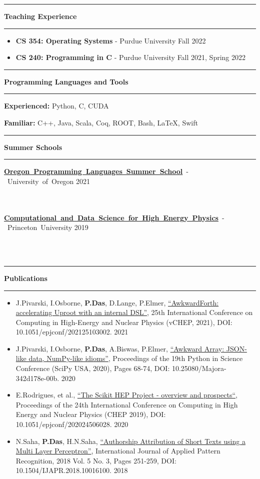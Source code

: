 \documentclass[10pt, letterpaper]{article}
\newcommand{\EducationEntry}[4]{
    \noindent\mbox{#1} \hfill
    \mbox{#2} \\
    \indent
    \mbox{\textit{#3}} \vspace{5pt}\\
    \parbox[t][\height][c]{\textwidth}{\small{#4}}
	\vspace{-14pt}
}
\newcommand{\Section}[1]{
    \Line \par
    \vspace{1pt}
    \textbf{\fontsize{13}{13}\selectfont #1} \par
    \vspace{-7pt}
    \Line \par
    \vspace{3pt}
}
\newcommand{\Line}{
\noindent\rule{\textwidth}{0.4pt}}
\newenvironment{tightitemize}
{
    \vspace{-\topsep}
    \begin{itemize}
        \itemsep2pt \parskip0pt \parsep0pt
}
{
    \end{itemize}
    \vspace{-\topsep}
}
\begin{document}
\Section{Teaching Experience}
\begin{tightitemize}
\item \textbf{CS 354: Operating Systems} - Purdue University \hfill{Fall 2022}
\item \textbf{CS 240: Programming in C} - Purdue University \hfill{Fall 2021, Spring 2022}
\end{tightitemize}

\vspace{-4pt}
%
%
\Section{Programming Languages and Tools}
\vspace{-4pt}
\textbf{Experienced:} Python, C, CUDA

\textbf{Familiar:} C++, Java, Scala, Coq, ROOT, Bash, \LaTeX, Swift
\vspace{-6pt}

%
%
\Section{Summer Schools}
\vspace{-4pt}
\EducationEntry{\textbf{{\href{https://www.cs.uoregon.edu/research/summerschool/summer21/index.php}{Oregon Programming Languages Summer School}}} - University of Oregon}{2021}{}{}\vspace{-15pt}\\
\EducationEntry{\textbf{{\href{https://codas-hep.org/}{Computational and Data Science for High Energy Physics}}} - Princeton University}{2019}{}{}\\

\vspace{-34pt}

%
%
\Section{Publications}
\small{\begin{tightitemize}
    \item J.Pivarski, I.Osborne, {\textbf{P.Das}}, D.Lange, P.Elmer, {\href{https://www.epj-conferences.org/articles/epjconf/abs/2021/05/epjconf_chep2021_03002/epjconf_chep2021_03002.html}{``AwkwardForth: accelerating Uproot with an internal DSL''}}, 25th International Conference on Computing in High-Energy and Nuclear Physics (vCHEP, 2021), DOI: 10.1051/epjconf/202125103002. \hfill{2021}
    \item J.Pivarski, I.Osborne, {\textbf{P.Das}}, A.Biswas, P.Elmer, {\href{http://conference.scipy.org/proceedings/scipy2020/jim_pivarski.html}{``Awkward Array: JSON-like data, NumPy-like idioms''}}, Proceedings of the 19th Python in Science Conference (SciPy USA, 2020), Pages 68-74, DOI: 10.25080/Majora-342d178e-00b. \hfill{2020}
    \item E.Rodrigues, et al., {\href{https://www.epj-conferences.org/articles/epjconf/abs/2020/21/epjconf_chep2020_06028/epjconf_chep2020_06028.html}{``The Scikit HEP Project - overview and prospects``}}, Proceedings of the 24th International Conference on Computing in High Energy and Nuclear Physics (CHEP 2019), DOI: 10.1051/epjconf/202024506028.  \hfill{2020}
    \item N.Saha, {\textbf{P.Das}}, H.N.Saha, {\href{https://www.inderscienceonline.com/doi/abs/10.1504/IJAPR.2018.094819}{``Authorship Attribution of Short Texts using a Multi Layer Perceptron''}}, International Journal of Applied Pattern Recognition, 2018 Vol. 5 No. 3, Pages 251-259, DOI: 10.1504/IJAPR.2018.10016100. \hfill{2018}
\end{tightitemize}}
\end{document}
